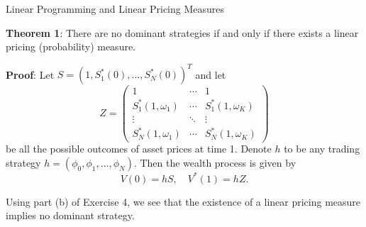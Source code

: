 \documentclass{beamer}
\begin{document}
\begin{frame}{Linear Programming and Linear Pricing Measures}

    {\footnotesize \footnotesize
    \par \textbf{Theorem 1}: There are no dominant strategies 
    if and only if there exists a linear pricing (probability) measure.
    \vspace{1em}
    \par \textbf{Proof}:
    Let $S = (1, S_1^*(0), \ldots, S_N^*(0))^T$ and let
    \[
    Z =
    \begin{pmatrix}
    1 & \cdots & 1 \\
    S_1^*(1, \omega_1) & \cdots & S_1^*(1, \omega_K) \\
    \vdots & \ddots & \vdots \\
    S_N^*(1, \omega_1) & \cdots & S_N^*(1, \omega_K)
    \end{pmatrix}
    \]
    be all the possible outcomes of asset prices at time 1. Denote $h$ to be any trading strategy $h = (\phi_0, \phi_1, \ldots, \phi_N)$. Then the wealth process is given by
    \[
    V(0) = hS, \quad V^*(1) = hZ.
    \]
    \par Using part (b) of Exercise 4, we 
    see that the existence of a linear pricing measure implies no dominant strategy.


    }
\end{frame}
\end{document}
